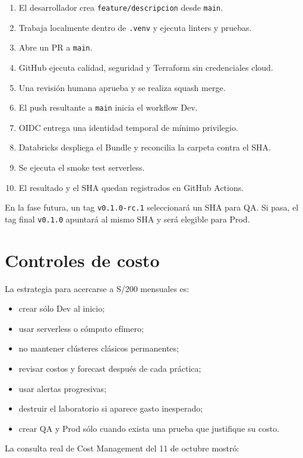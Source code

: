 \documentclass[11pt,a4paper]{article}
\begin{document}
\begin{enumerate}
  \item El desarrollador crea \texttt{feature/descripcion} desde \texttt{main}.
  \item Trabaja localmente dentro de \texttt{.venv} y ejecuta linters y pruebas.
  \item Abre un PR a \texttt{main}.
  \item GitHub ejecuta calidad, seguridad y Terraform sin credenciales cloud.
  \item Una revisión humana aprueba y se realiza squash merge.
  \item El push resultante a \texttt{main} inicia el workflow Dev.
  \item OIDC entrega una identidad temporal de mínimo privilegio.
  \item Databricks despliega el Bundle y reconcilia la carpeta contra el SHA.
  \item Se ejecuta el smoke test serverless.
  \item El resultado y el SHA quedan registrados en GitHub Actions.
\end{enumerate}

En la fase futura, un tag \texttt{v0.1.0-rc.1} seleccionará un SHA para QA. Si pasa, el tag final
\texttt{v0.1.0} apuntará al mismo SHA y será elegible para Prod.

\section{Controles de costo}

La estrategia para acercarse a S/200 mensuales es:

\begin{itemize}
  \item crear sólo Dev al inicio;
  \item usar serverless o cómputo efímero;
  \item no mantener clústeres clásicos permanentes;
  \item revisar costos y forecast después de cada práctica;
  \item usar alertas progresivas;
  \item destruir el laboratorio si aparece gasto inesperado;
  \item crear QA y Prod sólo cuando exista una prueba que justifique su costo.
\end{itemize}

La consulta real de Cost Management del 11 de octubre mostró:
\end{document}
